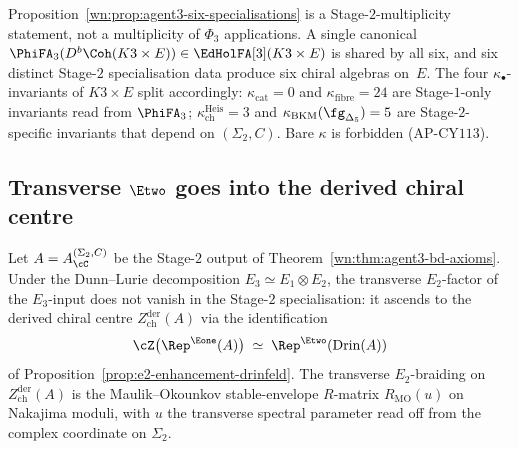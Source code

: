 \begin{remark}
\label{wn:rem:agent3-pattern-273}
Proposition~\ref{wn:prop:agent3-six-specialisations} is a Stage-$2$-multiplicity statement, not a multiplicity of $\Phi_3$ applications. A single canonical $\PhiFA_3(D^b\Coh(K3\times E))\in\EdHolFA[3](K3\times E)$ is shared by all six, and six distinct Stage-$2$ specialisation data produce six chiral algebras on~$E$. The four $\kappa_\bullet$-invariants of $K3\times E$ split accordingly: $\kappa_{\mathrm{cat}}=0$ and $\kappa_{\mathrm{fibre}}=24$ are Stage-$1$-only invariants read from $\PhiFA_3$; $\kappa_{\mathrm{ch}}^{\mathrm{Heis}}=3$ and $\kappa_{\mathrm{BKM}}(\fg_{\Delta_5})=5$ are Stage-$2$-specific invariants that depend on $(\Sigma_2,C)$. Bare $\kappa$ is forbidden (AP-CY$113$).
\end{remark}

\subsection{Transverse \texorpdfstring{$\Etwo$}{E-2} goes into the derived chiral centre}
\label{wn:subsec:agent3-e2-transverse}

\begin{proposition}
\label{wn:prop:agent3-e2-transverse-ascends}
\ClaimStatusProvedElsewhere{}
Let $A=A^{(\Sigma_2,C)}_\cC$ be the Stage-$2$ output of Theorem~\ref{wn:thm:agent3-bd-axioms}. Under the Dunn--Lurie decomposition $E_3\simeq E_1\otimes E_2$, the transverse $E_2$-factor of the $E_3$-input does not vanish in the Stage-$2$ specialisation: it ascends to the derived chiral centre $Z^{\mathrm{der}}_{\mathrm{ch}}(A)$ via the identification
\[
 \cZ\bigl(\Rep^{\Eone}(A)\bigr)
 \;\simeq\;
 \Rep^{\Etwo}(\mathrm{Drin}(A))
\]
of Proposition~\ref{prop:e2-enhancement-drinfeld}. The transverse $E_2$-braiding on $Z^{\mathrm{der}}_{\mathrm{ch}}(A)$ is the Maulik--Okounkov stable-envelope $R$-matrix $R_{\mathrm{MO}}(u)$ on Nakajima moduli, with $u$ the transverse spectral parameter read off from the complex coordinate on $\Sigma_2$.
\end{proposition}

